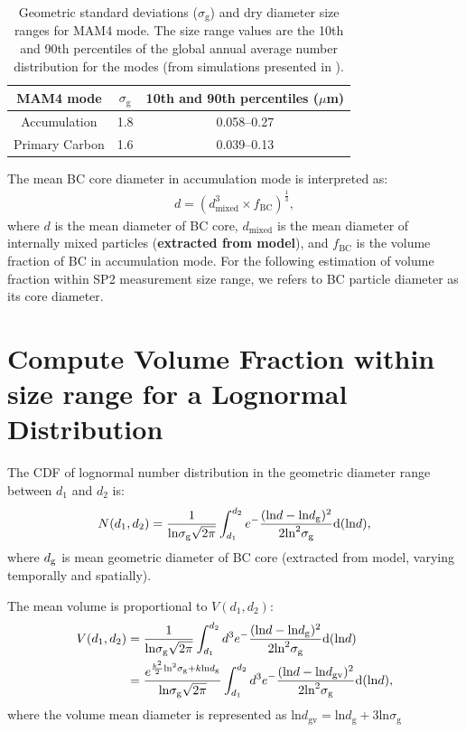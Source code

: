 \documentclass[11pt]{article}
\begin{document}
\begin{table}
	\begin{center}
		\begin{tabular}{c c c}
			\hline  
			MAM4 mode & $\sigma_{\text{g}}$ &  10th and 90th percentiles ($\mu$m)		\\   \hline
			Accumulation  & 1.8  &   0.058--0.27 		\\ \hline
			Primary Carbon   & 1.6  &  0.039--0.13  		\\
			\hline			
		\end{tabular}
	\end{center}
\caption{\label{tab:ozone} Geometric standard deviations ($\sigma_{\text{g}}$) and dry diameter size ranges for MAM4 mode. The size range values are the 10th and 90th percentiles of the global annual average number distribution for the modes (from simulations presented in \citet{Liu2012}).\label{tab:mam4_modes}}
\end{table}


The mean BC core diameter in accumulation mode is interpreted as:
\begin{align*}
d = (d_{\text{mixed}}^3 \times f_{\text{BC}})^\frac{1}{3}, 
\end{align*}
where $d$ is the mean diameter of BC core,
$d_{\text{mixed}}$ is the mean diameter of internally mixed particles
(\textbf{extracted from model}), and $f_{\text{BC}}$ is the volume
fraction of BC in accumulation mode. For the following estimation of volume fraction within SP2 measurement size range, we refers to BC particle diameter as its core diameter.

\section{Compute Volume Fraction within size range for a Lognormal Distribution}
The CDF of lognormal number distribution in the geometric diameter range between $d_{1}$ and
$d_{2}$ is:
\begin{align*}
N(d_{1}, d_{2}) = \frac{1}{\text{ln}\sigma_{\text{g}}\sqrt{2\pi}}\int_{d_{1}}^{d_{2}}e^-\frac{(\text{ln}d - \text{ln}d_{\rm g})^2}{2\text{ln}^2\sigma_{\text{g}}}\text{d}(\text{ln}d),
\end{align*}
where $d_{\rm g}$ is mean geometric diameter of BC core (extracted from model, varying temporally and spatially). 

The mean volume is proportional to $V(d_{1}, d_{2})$:
\begin{align*}
V(d_{1}, d_{2}) &= \frac{1}{\text{ln}\sigma_{\text{g}}\sqrt{2\pi}}\int_{d_{1}}^{d_{2}}d^3e^-\frac{(\text{ln}d - \text{ln}d_{\rm g})^2}{2\text{ln}^2\sigma_{\text{g}}}\text{d}(\text{ln}d)  \\
&=\frac{e^{\frac{k^2}{2}\text{ln}^2\sigma_{\rm g}+k\text{ln}d_{\rm g}}}{\text{ln}\sigma_{\text{g}}\sqrt{2\pi}}\int_{d_{1}}^{d_{2}}d^3e^-\frac{(\text{ln}d - \text{ln}d_{\text{gv}})^2}{2\text{ln}^2\sigma_{\text{g}}}\text{d}(\text{ln}d),
\end{align*}
where the volume mean diameter is represented as $\text{ln}d_{\text{gv}}
= \text{ln}d_{\text{g}} + 3\text{ln}\sigma_{\text{g}}$
\end{document}
